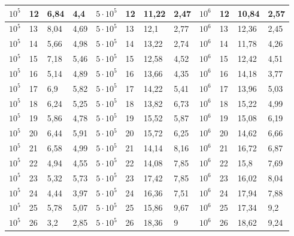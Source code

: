 \documentclass[letterpaper]{article}
\begin{document}
\begin{table}[t]
\begin{tabular}{||l|l|l|l||l|l|l|l||l|l|l|l||}
$10^5$ & 12            & 6,84 & 4,4  & $5 \cdot 10^5$ & 12            & 11,22 & 2,47  & $10^6$ & 12            & 10,84 & 2,57  \\ \hline
$10^5$ & 13            & 8,04 & 4,69 & $5 \cdot 10^5$ & 13            & 12,1  & 2,77  & $10^6$ & 13            & 12,36 & 2,45  \\ \hline
$10^5$ & 14            & 5,66 & 4,98 & $5 \cdot 10^5$ & 14            & 13,22 & 2,74  & $10^6$ & 14            & 11,78 & 4,26  \\ \hline
$10^5$ & 15            & 7,18 & 5,46 & $5 \cdot 10^5$ & 15            & 12,58 & 4,52  & $10^6$ & 15            & 12,42 & 4,51  \\ \hline
$10^5$ & 16            & 5,14 & 4,89 & $5 \cdot 10^5$ & 16            & 13,66 & 4,35  & $10^6$ & 16            & 14,18 & 3,77  \\ \hline
$10^5$ & 17            & 6,9  & 5,82 & $5 \cdot 10^5$ & 17            & 14,22 & 5,41  & $10^6$ & 17            & 13,96 & 5,03  \\ \hline
$10^5$ & 18            & 6,24 & 5,25 & $5 \cdot 10^5$ & 18            & 13,82 & 6,73  & $10^6$ & 18            & 15,22 & 4,99  \\ \hline
$10^5$ & 19            & 5,86 & 4,78 & $5 \cdot 10^5$ & 19            & 15,52 & 5,87  & $10^6$ & 19            & 15,08 & 6,19  \\ \hline
$10^5$ & 20            & 6,44 & 5,91 & $5 \cdot 10^5$ & 20            & 15,72 & 6,25  & $10^6$ & 20            & 14,62 & 6,66  \\ \hline
$10^5$ & 21            & 6,58 & 4,99 & $5 \cdot 10^5$ & 21            & 14,14 & 8,16  & $10^6$ & 21            & 16,72 & 6,87  \\ \hline
$10^5$ & 22            & 4,94 & 4,55 & $5 \cdot 10^5$ & 22            & 14,08 & 7,85  & $10^6$ & 22            & 15,8  & 7,69  \\ \hline
$10^5$ & 23            & 5,32 & 5,73 & $5 \cdot 10^5$ & 23            & 17,42 & 7,85  & $10^6$ & 23            & 16,02 & 8,04  \\ \hline
$10^5$ & 24            & 4,44 & 3,97 & $5 \cdot 10^5$ & 24            & 16,36 & 7,51  & $10^6$ & 24            & 17,94 & 7,88  \\ \hline
$10^5$ & 25            & 5,78 & 5,07 & $5 \cdot 10^5$ & 25            & 15,86 & 9,67  & $10^6$ & 25            & 17,34 & 9,2   \\ \hline
$10^5$ & 26            & 3,2  & 2,85 & $5 \cdot 10^5$ & 26            & 18,36 & 9     & $10^6$ & 26            & 18,62 & 9,24  \\ \hline

\end{tabular}
\end{table}
\end{document}
